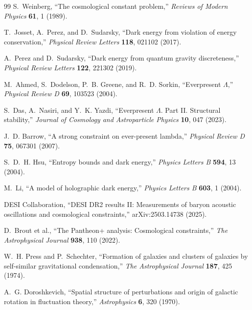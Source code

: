 \documentclass[11pt]{article}
\begin{document}
\begin{thebibliography}{99}
S.~Weinberg,
``The cosmological constant problem,''
\emph{Reviews of Modern Physics} \textbf{61}, 1 (1989).

T.~Josset, A.~Perez, and D.~Sudarsky,
``Dark energy from violation of energy conservation,''
\emph{Physical Review Letters} \textbf{118}, 021102 (2017).

A.~Perez and D.~Sudarsky,
``Dark energy from quantum gravity discreteness,''
\emph{Physical Review Letters} \textbf{122}, 221302 (2019).

M.~Ahmed, S.~Dodelson, P.~B. Greene, and R.~D. Sorkin,
``Everpresent $\Lambda$,''
\emph{Physical Review D} \textbf{69}, 103523 (2004).

S.~Das, A.~Nasiri, and Y.~K. Yazdi,
``Everpresent $\Lambda$. Part II. Structural stability,''
\emph{Journal of Cosmology and Astroparticle Physics} \textbf{10}, 047 (2023).

J.~D. Barrow,
``A strong constraint on ever-present lambda,''
\emph{Physical Review D} \textbf{75}, 067301 (2007).

S.~D.~H. Hsu,
``Entropy bounds and dark energy,''
\emph{Physics Letters B} \textbf{594}, 13 (2004).

M.~Li,
``A model of holographic dark energy,''
\emph{Physics Letters B} \textbf{603}, 1 (2004).

DESI Collaboration,
``DESI DR2 results II: Measurements of baryon acoustic oscillations and cosmological constraints,''
arXiv:2503.14738 (2025).

D.~Brout et al.,
``The Pantheon+ analysis: Cosmological constraints,''
\emph{The Astrophysical Journal} \textbf{938}, 110 (2022).

W.~H. Press and P.~Schechter,
``Formation of galaxies and clusters of galaxies by self-similar gravitational condensation,''
\emph{The Astrophysical Journal} \textbf{187}, 425 (1974).

A.~G. Doroshkevich,
``Spatial structure of perturbations and origin of galactic rotation in fluctuation theory,''
\emph{Astrophysics} \textbf{6}, 320 (1970).


\end{thebibliography}
\end{document}
